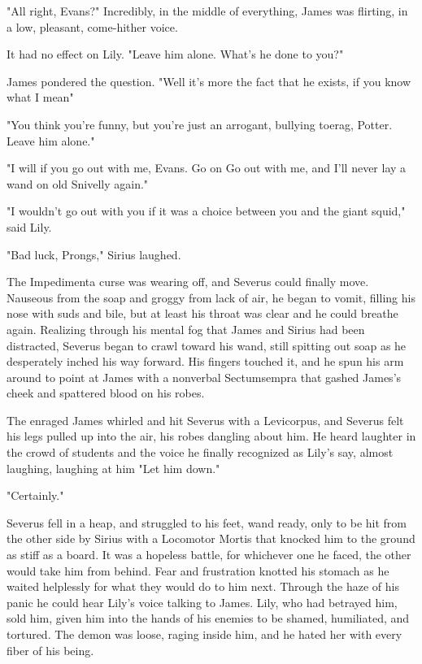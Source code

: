 "All right, Evans?" Incredibly, in the middle of everything, James was flirting, in a low, pleasant, come-hither voice.

It had no effect on Lily. "Leave him alone. What's he done to you?"

James pondered the question. "Well{\el} it's more the fact that he exists, if you know what I mean{\el}"

"You think you're funny, but you're just an arrogant, bullying toerag, Potter. Leave him alone."

"I will if you go out with me, Evans. Go on{\el} Go out with me, and I'll never lay a wand on old Snivelly again."

"I wouldn't go out with you if it was a choice between you and the giant squid," said Lily.

"Bad luck, Prongs," Sirius laughed.

The Impedimenta curse was wearing off, and Severus could finally move. Nauseous from the soap and groggy from lack of air, he began to vomit, filling his nose with suds and bile, but at least his throat was clear and he could breathe again. Realizing through his mental fog that James and Sirius had been distracted, Severus began to crawl toward his wand, still spitting out soap as he desperately inched his way forward. His fingers touched it, and he spun his arm around to point at James with a nonverbal Sectumsempra that gashed James's cheek and spattered blood on his robes.

The enraged James whirled and hit Severus with a Levicorpus, and Severus felt his legs pulled up into the air, his robes dangling about him. He heard laughter in the crowd of students and the voice he finally recognized as Lily's say, almost laughing, laughing at him{\el} "Let him down."

"Certainly."

Severus fell in a heap, and struggled to his feet, wand ready, only to be hit from the other side by Sirius with a Locomotor Mortis that knocked him to the ground as stiff as a board. It was a hopeless battle, for whichever one he faced, the other would take him from behind. Fear and frustration knotted his stomach as he waited helplessly for what they would do to him next. Through the haze of his panic he could hear Lily's voice talking to James. Lily, who had betrayed him, sold him, given him into the hands of his enemies to be shamed, humiliated, and tortured. The demon was loose, raging inside him, and he hated her with every fiber of his being.

